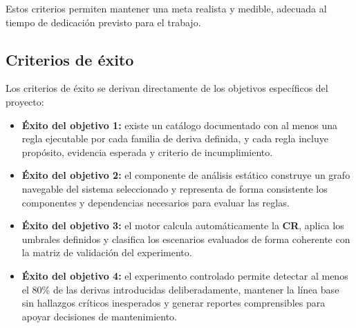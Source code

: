 Estos criterios permiten mantener una meta realista y medible, adecuada al tiempo de dedicación previsto para el trabajo.

\subsection{Criterios de éxito}

Los criterios de éxito se derivan directamente de los objetivos específicos del proyecto:

\begin{itemize}
    \item \textbf{Éxito del objetivo 1:} existe un catálogo documentado con al menos una regla ejecutable por cada familia de deriva definida, y cada regla incluye propósito, evidencia esperada y criterio de incumplimiento.
    \item \textbf{Éxito del objetivo 2:} el componente de análisis estático construye un grafo navegable del sistema seleccionado y representa de forma consistente los componentes y dependencias necesarios para evaluar las reglas.
    \item \textbf{Éxito del objetivo 3:} el motor calcula automáticamente la \textbf{CR}, aplica los umbrales definidos y clasifica los escenarios evaluados de forma coherente con la matriz de validación del experimento.
    \item \textbf{Éxito del objetivo 4:} el experimento controlado permite detectar al menos el 80\% de las derivas introducidas deliberadamente, mantener la línea base sin hallazgos críticos inesperados y generar reportes comprensibles para apoyar decisiones de mantenimiento.
\end{itemize}
